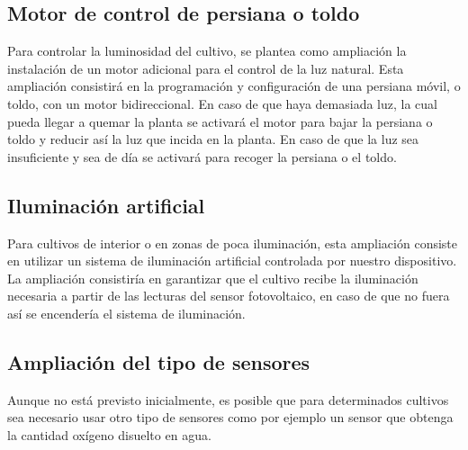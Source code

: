 \documentclass[12pt,a4paper,titlepage,oneside]{report}
\begin{document}
	\subsection*{Motor de control de persiana o toldo}
	Para controlar la luminosidad del cultivo, se plantea como ampliación la instalación de un motor adicional para el control de la luz natural. Esta ampliación consistirá en la programación y configuración de una persiana móvil, o toldo, con un motor bidireccional. En caso de que haya demasiada luz, la cual pueda llegar a quemar la planta se activará el motor para bajar la persiana o toldo y reducir así la luz que incida en la planta. En caso de que la luz sea insuficiente y sea de día se activará para recoger la persiana o el toldo.
	
	\subsection*{Iluminación artificial}
	Para cultivos de interior o en zonas de poca iluminación, esta ampliación consiste en utilizar un sistema de iluminación artificial controlada por nuestro dispositivo. La ampliación consistiría en garantizar que el cultivo recibe la iluminación necesaria a partir de las lecturas del sensor fotovoltaico, en caso de que no fuera así se encendería el sistema de iluminación.


	\subsection*{Ampliación del tipo de sensores}
	Aunque no está previsto inicialmente, es posible que para determinados cultivos sea necesario usar otro tipo de sensores como por ejemplo un sensor que obtenga la cantidad oxígeno disuelto en agua.




	
\newpage
{}


\end{document}
